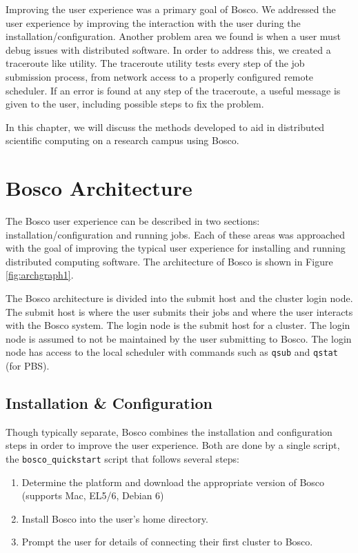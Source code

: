 Improving the user experience was a primary goal of Bosco.  We addressed the user experience by improving the interaction with the user during the installation/configuration.  Another problem area we found is when a user must debug issues with distributed software.  In order to address this, we created a traceroute \cite{mao2003towards} like utility.  The traceroute utility tests every step of the job submission process, from network access to a properly configured remote scheduler.  If an error is found at any step of the traceroute, a useful message is given to the user, including possible steps to fix the problem.




In this chapter, we will discuss the methods developed to aid in distributed scientific computing on a research campus using Bosco.  

\section{Bosco Architecture}
\label{sec:boscoarch}

% 

The Bosco user experience can be described in two sections: installation/configuration and running jobs.  Each of these areas was approached with the goal of improving the typical user experience for installing and running distributed computing software.  The architecture of Bosco is shown in Figure \ref{fig:archgraph1}.

The Bosco architecture is divided into the submit host and the cluster login node.  The submit host is where the user submits their jobs and where the user interacts with the Bosco system.  The login node is the submit host for a cluster.  The login node is assumed to not be maintained by the user submitting to Bosco.  The login node has access to the local scheduler with commands such as \texttt{qsub} and \texttt{qstat} (for PBS). 

\subsection{Installation \& Configuration}
Though typically separate, Bosco combines the installation and configuration steps in order to improve the user experience.  Both are done by a single script, the \texttt{bosco\_quickstart} script that follows several steps:

\begin{enumerate}
\item Determine the platform and download the appropriate version of Bosco (supports Mac, EL5/6, Debian 6)
\item Install Bosco into the user's home directory.
\item Prompt the user for details of connecting their first cluster to Bosco.
\end{enumerate}

